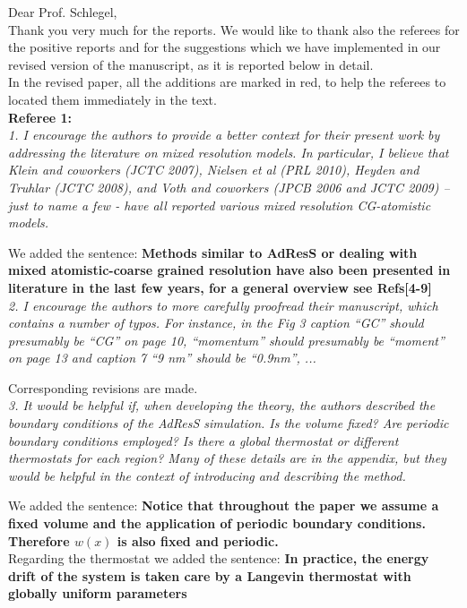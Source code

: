 \documentclass[a4paper]{article}
\begin{document}
\noindent
Dear Prof. Schlegel,\\

Thank you very much for the reports. We would like to thank also the referees for the positive reports and for the suggestions which we have implemented in our revised version of the manuscript, as it is reported below in detail.\\

In the revised paper, all the additions are marked in red, to help the referees to located them immediately in the text.\\

\noindent
{\bf Referee 1:}\\

\textit{
1. I encourage the authors to provide a better context for their
present work by addressing the literature on mixed resolution
models. In particular, I believe that Klein and coworkers (JCTC 2007),
Nielsen et al (PRL 2010), Heyden and Truhlar (JCTC 2008), and Voth and
coworkers (JPCB 2006 and JCTC 2009) – just to name a few - have all
reported various mixed resolution CG-atomistic models.
}

We added the sentence: {\bf Methods similar to AdResS or dealing with mixed atomistic-coarse grained resolution have also been presented in literature in the last few years, for a general overview see Refs[4-9]}
\\

\textit{
2. I encourage the authors to more carefully proofread their
manuscript, which contains a number of typos. For instance, in the Fig
3 caption ``GC'' should presumably be ``CG'' on page 10, ``momentum'' should
presumably be ``moment'' on page 13 and caption 7 “9 nm” should be
``0.9nm'', ...
}

Corresponding revisions are made. 
\\

\textit{
3. It would be helpful if, when developing the theory, the authors
described the boundary conditions of the AdResS simulation. Is the
volume fixed? Are periodic boundary conditions employed? Is there a
global thermostat or different thermostats for each region? Many of
these details are in the appendix, but they would be helpful in the
context of introducing and describing the method.
}

We added the sentence: {\bf Notice that throughout the paper we assume a fixed volume and the application of periodic boundary conditions. Therefore $w(x)$ is also fixed and periodic.}\\
Regarding the thermostat we added the sentence: {\bf In practice, the energy drift of the system is taken care by a Langevin thermostat with globally uniform parameters}
\\
\end{document}
